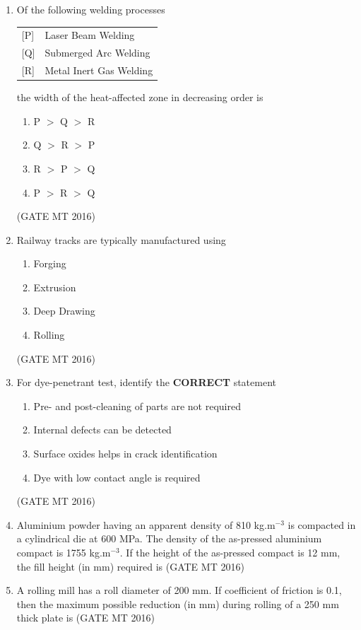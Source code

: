 \documentclass[11pt, letterpaper]{article}
\theoremstyle{remark}
\begin{document}
\begin{enumerate}
\item Of the following welding processes  

\begin{tabular}{ll}
{[P]} & Laser Beam Welding \\
{[Q]} & Submerged Arc Welding \\
{[R]} & Metal Inert Gas Welding \\
\end{tabular}

the width of the heat-affected zone in decreasing order is
\begin{enumerate}
\item P $>$ Q $>$ R
\item Q $>$ R $>$ P
\item R $>$ P $>$ Q
\item P $>$ R $>$ Q
\end{enumerate}
\hfill(GATE MT 2016)

\item Railway tracks are typically manufactured using
\begin{multicols}{4}
\begin{enumerate}
\item Forging
\item Extrusion
\item Deep Drawing
\item Rolling
\end{enumerate}   
\end{multicols}
\hfill(GATE MT 2016)


\item For dye-penetrant test, identify the \textbf{CORRECT} statement
\begin{enumerate}
\item Pre- and post-cleaning of parts are not required
\item Internal defects can be detected
\item Surface oxides helps in crack identification
\item Dye with low contact angle is required
\end{enumerate}
\hfill(GATE MT 2016)

\item Aluminium powder having an apparent density of 810 kg.m$^{-3}$ is compacted in a cylindrical die at 600 MPa. The density of the as-pressed aluminium compact is 1755 kg.m$^{-3}$. If the height of the as-pressed compact is 12 mm, the fill height (in mm) required is 
\hfill(GATE MT 2016)

\item A rolling mill has a roll diameter of 200 mm. If coefficient of friction is 0.1, then the maximum possible reduction (in mm) during rolling of a 250 mm thick plate is 
\hfill(GATE MT 2016)


\end{enumerate}
\end{document}
